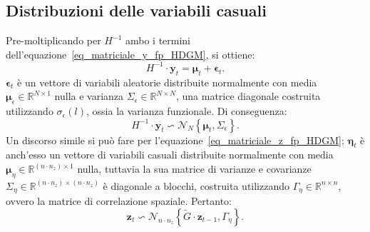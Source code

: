 \subsection[Distribuzioni delle variabili casuali]{Distribuzioni delle variabili casuali}
Pre-moltiplicando per $H^{-1}$ ambo i termini dell'equazione~\ref{eq_matriciale_y_fp_HDGM}, si ottiene:
\[
H^{-1}\cdot\mathbf{y}_t  = \boldsymbol{\mu}_t + \boldsymbol{\epsilon}_t.
\]
$\boldsymbol{\epsilon}_t$ è un vettore di variabili aleatorie distribuite normalmente con media $\boldsymbol{\mu}_\epsilon\in\mathbb{R}^{N\times1}$ nulla e varianza $\Sigma_\epsilon\in\mathbb{R}^{N\times N}$, una matrice diagonale costruita utilizzando $\sigma_\epsilon(l)$, ossia la varianza funzionale. Di conseguenza:
\[
H^{-1}\cdot\mathbf{y}_t\backsim\mathcal{N}_N\left\{\boldsymbol{\mu}_t, \Sigma_\epsilon\right\}.
\]
Un discorso simile si può fare per l'equazione~\ref{eq_matriciale_z_fp_HDGM}; $\boldsymbol{\eta}_t$ è anch'esso un vettore di variabili casuali distribuite normalmente con media $\boldsymbol{\mu}_\eta\in\mathbb{R}^{(n\cdot n_z)\times1}$ nulla, tuttavia la sua matrice di varianze e covarianze $\Sigma_\eta\in\mathbb{R}^{(n\cdot n_z)\times(n\cdot n_z)}$ è diagonale a blocchi, costruita utilizzando $\Gamma_\eta\in\mathbb{R}^{n\times n}$, ovvero la matrice di correlazione spaziale. Pertanto:
\[
\mathbf{z}_t\backsim\mathcal{N}_{n\cdot n_z}\left\{\tilde{G}\cdot\mathbf{z}_{t-1}, \Gamma_\eta\right\}.
\]

